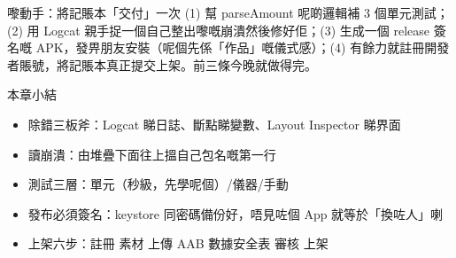 \begin{tcbpractice}{嚟動手：將記賬本「交付」一次}
(1) 幫 parseAmount 呢啲邏輯補 3 個單元測試；(2) 用 Logcat 親手捉一個自己整出嚟嘅崩潰然後修好佢；(3) 生成一個 release 簽名嘅 APK，發畀朋友安裝（呢個先係「作品」嘅儀式感）；(4) 有餘力就註冊開發者賬號，將記賬本真正提交上架。前三條今晚就做得完。

\end{tcbpractice}

\begin{tcbsummary}{本章小結}
\begin{itemize}
  \item 除錯三板斧：Logcat 睇日誌、斷點睇變數、Layout Inspector 睇界面
  \item 讀崩潰：由堆疊下面往上搵自己包名嘅第一行
  \item 測試三層：單元（秒級，先學呢個）/儀器/手動
  \item 發布必須簽名：keystore 同密碼備份好，唔見咗個 App 就等於「換咗人」喇
  \item 上架六步：註冊 素材 上傳 AAB 數據安全表 審核 上架
\end{itemize}

\end{tcbsummary}
